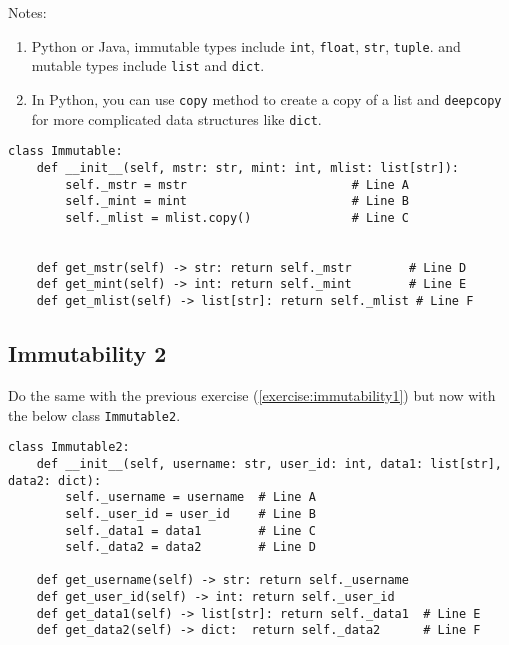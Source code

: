\documentclass[oneside,11pt,dvipsnames]{book}
\newcommand{\code}[1]{\texttt{#1}}
\begin{document}
Notes:
\begin{enumerate}
\item Python or Java, immutable types include \code{int}, \code{float}, \code{str}, \code{tuple}. and mutable types include \code{list} and \code{dict}. 
\item In Python, you can use \code{copy} method to create a copy of a list and \code{deepcopy} for more complicated data structures like \code{dict}.
\end{enumerate}    

\begin{lstlisting}
class Immutable:
    def __init__(self, mstr: str, mint: int, mlist: list[str]):
        self._mstr = mstr                       # Line A
        self._mint = mint                       # Line B
        self._mlist = mlist.copy()              # Line C

    
    def get_mstr(self) -> str: return self._mstr        # Line D
    def get_mint(self) -> int: return self._mint        # Line E
    def get_mlist(self) -> list[str]: return self._mlist # Line F
\end{lstlisting}


\subsection{Immutability 2}\label{exercise:immutability2}
Do the same with the previous exercise (\autoref{exercise:immutability1}) but now with the below class \code{Immutable2}.
\begin{lstlisting}
class Immutable2:
    def __init__(self, username: str, user_id: int, data1: list[str], data2: dict):
        self._username = username  # Line A
        self._user_id = user_id    # Line B
        self._data1 = data1        # Line C
        self._data2 = data2        # Line D
        
    def get_username(self) -> str: return self._username
    def get_user_id(self) -> int: return self._user_id
    def get_data1(self) -> list[str]: return self._data1  # Line E
    def get_data2(self) -> dict:  return self._data2      # Line F
\end{lstlisting}


\end{document}
